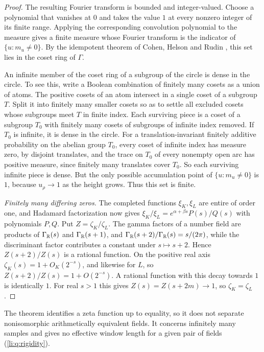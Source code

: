 \begin{proof}
The resulting Fourier transform is bounded and integer-valued. Choose a polynomial that vanishes
at $0$ and takes the value $1$ at every nonzero integer of its finite range. Applying the
corresponding convolution polynomial to the measure gives a finite measure whose Fourier
transform is the indicator of $\{u:m_u\ne0\}$. By the idempotent theorem of Cohen, Helson and
Rudin \cite{GreenSanders2008Quantitative}, this set lies in the coset ring of $\Gamma$.

An infinite member of the coset ring of a subgroup of the circle is dense in the circle. To see
this, write a Boolean combination of finitely many cosets as a union of atoms. The positive
cosets of an atom intersect in a single coset of a subgroup $T$. Split it into finitely many
smaller cosets so as to settle all excluded cosets whose subgroups meet $T$ in finite index. Each
surviving piece is a coset of a subgroup $T_0$ with finitely many cosets of subgroups of infinite
index removed. If $T_0$ is infinite, it is dense in the circle. For a translation-invariant
finitely additive probability on the abelian group $T_0$, every coset of infinite index has
measure zero, by disjoint translates, and the trace on $T_0$ of every nonempty open arc has
positive measure, since finitely many translates cover $T_0$. So each surviving infinite piece is
dense. But the only possible accumulation point of $\{u:m_u\ne0\}$ is $1$, because
$u_\rho\to1$ as the height grows. Thus this set is finite.

\emph{Finitely many differing zeros.} The completed functions $\xi_K,\xi_L$ are entire of order
one, and Hadamard factorization now gives $\xi_K/\xi_L=e^{\alpha+\beta s}P(s)/Q(s)$ with
polynomials $P,Q$. Put $Z=\zeta_K/\zeta_L$. The gamma factors of a number field are products of
$\Gamma_{\mathbb{R}}(s)$ and $\Gamma_{\mathbb{R}}(s+1)$, and $\Gamma_{\mathbb{R}}(s+2)/\Gamma_{\mathbb{R}}(s)=s/(2\pi)$, while the
discriminant factor contributes a constant under $s\mapsto s+2$. Hence $Z(s+2)/Z(s)$ is a
rational function. On the positive real axis $\zeta_K(s)=1+O_K(2^{-s})$, and likewise for $L$, so
$Z(s+2)/Z(s)=1+O(2^{-s})$. A rational function with this decay towards $1$ is identically $1$.
For real $s>1$ this gives $Z(s)=Z(s+2m)\to1$, so $\zeta_K=\zeta_L$.
\end{proof}

The theorem identifies a zeta function up to equality, so it does not separate nonisomorphic
arithmetically equivalent fields. It concerns infinitely many samples and gives no effective
window length for a given pair of fields (\cref{li:q:rigidity}).

